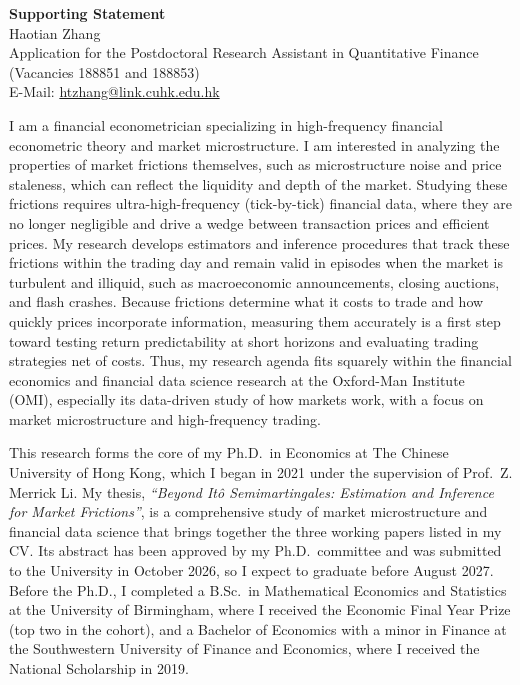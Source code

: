 \documentclass[12pt,a4paper]{article}
\begin{document}
\begin{center}
    {\LARGE \textbf{Supporting Statement}} \\ \vspace{5pt}
    {\large Haotian Zhang} \\ \vspace{5pt}
    Application for the Postdoctoral Research Assistant in Quantitative Finance 
    (Vacancies 188851 and 188853) \\ \vspace{3pt}
    E-Mail: \url{htzhang@link.cuhk.edu.hk}
\end{center}

I am a financial econometrician specializing in 
high-frequency financial econometric theory 
and market microstructure. 
I am interested in analyzing the properties of market frictions themselves, 
such as microstructure noise and price staleness, 
which can reflect the liquidity and depth of the market.
Studying these frictions requires ultra-high-frequency (tick-by-tick) financial data,
where they are no longer negligible and drive a wedge between
transaction prices and efficient prices.
My research develops estimators and inference procedures that track
these frictions within the trading day and remain valid in episodes when
the market is turbulent and illiquid, such as macroeconomic announcements,
closing auctions, and flash crashes.
Because frictions determine what it costs to trade
and how quickly prices incorporate information,
measuring them accurately is a first step toward testing return predictability
at short horizons and evaluating trading strategies net of costs.
Thus, my research agenda fits squarely 
within the financial economics and financial data science research
at the Oxford-Man Institute (OMI), especially its data-driven study of how markets work,
with a focus on market microstructure and high-frequency trading.

This research forms the core of my Ph.D.\ in Economics at The Chinese University of Hong Kong,
which I began in 2021 under the supervision of Prof.~Z. Merrick Li.
My thesis, \textit{``Beyond Itô Semimartingales: Estimation and Inference for Market Frictions''},
is a comprehensive study of market microstructure and financial data science
that brings together the three working papers listed in my CV.
Its abstract has been approved by my Ph.D.\ committee and was submitted to the University
in October 2026, so I expect to graduate before August 2027.
Before the Ph.D., I completed a B.Sc.\ in Mathematical Economics and Statistics
at the University of Birmingham, where I received the Economic Final Year Prize
(top two in the cohort), and a Bachelor of Economics with a minor in Finance
at the Southwestern University of Finance and Economics,
where I received the National Scholarship in 2019.
\end{document}
